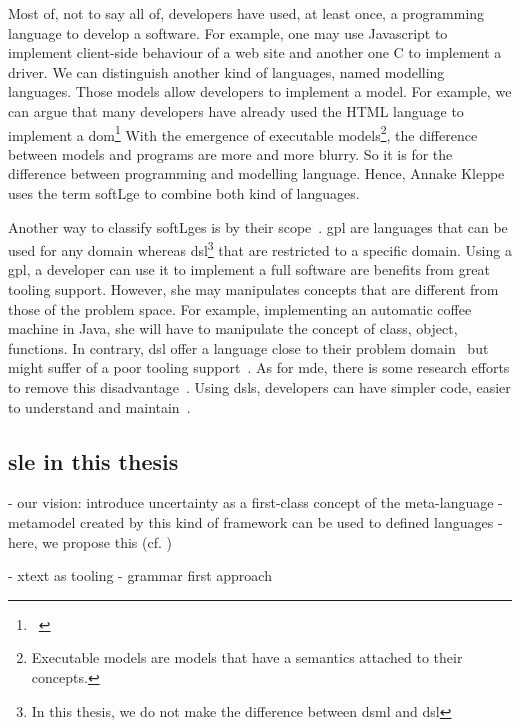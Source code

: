 	
Most of, not to say all of, developers have used, at least once, a programming language to develop a software.
For example, one may use Javascript to implement client-side behaviour of a web site and another one C to implement a driver.
We can distinguish another kind of languages, named modelling languages.
Those models allow developers to implement a model.
For example, we can argue that many developers have already used the HTML language to implement a \gls{dom}\footnote{~\cite{DOM:Spec}}
With the emergence of executable models\footnote{Executable models are models that have a semantics attached to their concepts.}, the difference between models and programs are more and more blurry.
So it is for the difference between programming and modelling language.
Hence, Annake Kleppe uses the term \gls{softLge} to combine both kind of languages.

Another way to classify \glspl{softLge} is by their scope~\cite{DBLP:journals/sigplan/DeursenKV00}.
\Gls{gpl} are languages that can be used for any domain whereas \gls{dsl}\footnote{In this thesis, we do not make the difference between \gls{dsml} and \gls{dsl}} that are restricted to a specific domain.
Using a \gls{gpl}, a developer can use it to implement a full software are benefits from great tooling support. 
However, she may manipulates concepts that are different from those of the problem space.
For example, implementing an automatic coffee machine in Java, she will have to manipulate the concept of class, object, functions.
In contrary, \gls{dsl} offer a language close to their problem domain~\cite{DBLP:journals/smr/DeursenK98} but might suffer of a poor tooling support~\cite{voelter2014generic}.
As for \gls{mde}, there is some research efforts to remove this disadvantage~\cite{DBLP:journals/jss/BousseLCWB18}. 
Using \glspl{dsl}, developers can have simpler code, easier to understand and maintain~\cite{DBLP:journals/sigplan/DeursenKV00, DBLP:journals/smr/DeursenK98}.
	
\subsection[SLE in this thesis]{\gls{sle} in this thesis}


- our vision: introduce uncertainty as a first-class concept of the meta-language
- metamodel created by this kind of framework can be used to defined languages
- here, we propose this (cf. )

- xtext as tooling - grammar first approach